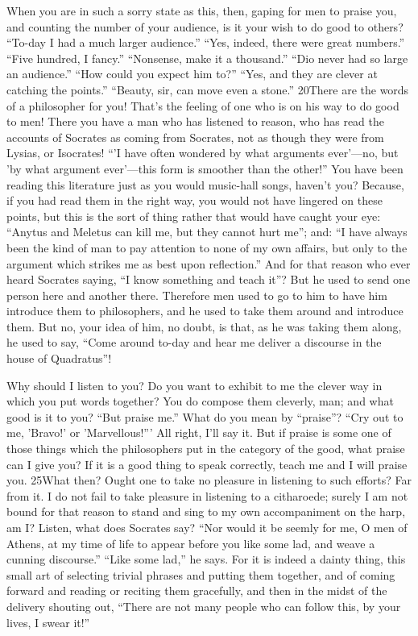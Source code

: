 When you are in such a sorry state as this, then, gaping for men to praise you, and counting the number of your audience, is it your wish to do good to others? ``To-day I had a much larger audience.'' ``Yes, indeed, there were great numbers.'' ``Five hundred, I fancy.'' ``Nonsense, make it a thousand.'' ``Dio never had so large an audience.'' ``How could you expect him to?'' ``Yes, and they are clever at catching the points.'' ``Beauty, sir, can move even a stone.'' 20There are the words of a philosopher for you! That's the feeling of one who is on his way to do good to men! There you have a man who has listened to reason, who has read the accounts of Socrates as coming from Socrates, not as though they were from Lysias, or Isocrates! ``'I have often wondered by what arguments ever'—no, but 'by what argument ever'—this form is smoother than the other!'' You have been reading this literature just as you would music-hall songs, haven't you? Because, if you had read them in the right way, you would not have lingered on these points, but this is the sort of thing rather that would have caught your eye: ``Anytus and Meletus can kill me, but they cannot hurt me''; and: ``I have always been the kind of man to pay attention to none of my own affairs, but only to the argument which strikes me as best upon reflection.'' And for that reason who ever heard Socrates saying, ``I know something and teach it''? But he used to send one person here and another there. Therefore men used to go to him to have him introduce them to philosophers, and he used to take them around and introduce them. But no, your idea of him, no doubt, is that, as he was taking them along, he used to say, ``Come around to-day and hear me deliver a discourse in the house of Quadratus''!

Why should I listen to you? Do you want to exhibit to me the clever way in which you put words together? You do compose them cleverly, man; and what good is it to you? ``But praise me.'' What do you mean by ``praise''? ``Cry out to me, 'Bravo!' or 'Marvellous!''' All right, I'll say it. But if praise is some one of those things which the philosophers put in the category of the good, what praise can I give you? If it is a good thing to speak correctly, teach me and I will praise you. 25What then? Ought one to take no pleasure in listening to such efforts? Far from it. I do not fail to take pleasure in listening to a citharoede; surely I am not bound for that reason to stand and sing to my own accompaniment on the harp, am I? Listen, what does Socrates say? ``Nor would it be seemly for me, O men of Athens, at my time of life to appear before you like some lad, and weave a cunning discourse.'' ``Like some lad,'' he says. For it is indeed a dainty thing, this small art of selecting trivial phrases and putting them together, and of coming forward and reading or reciting them gracefully, and then in the midst of the delivery shouting out, ``There are not many people who can follow this, by your lives, I swear it!''

